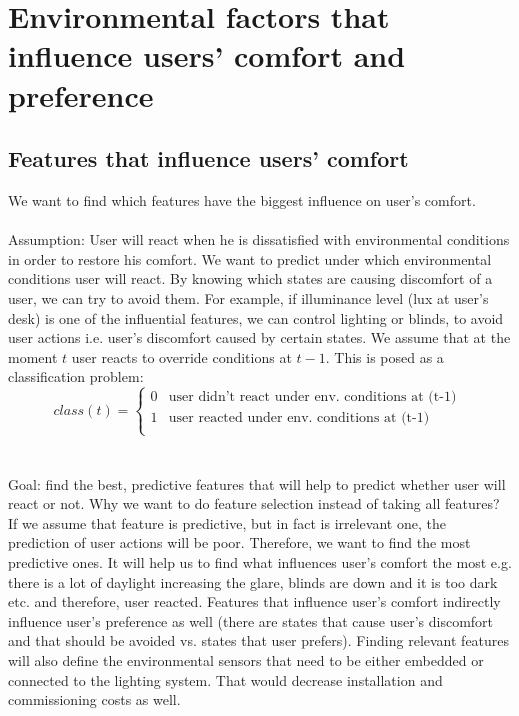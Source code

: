 \documentclass[a4paper]{article}
\begin{document}
\color{black}
\section{Environmental factors that  influence users' comfort and preference}
\subsection{Features that influence users' comfort} \label{sec:FeaturesUserComfort}

We want to find which features have the biggest influence on user's comfort.
\\\\
Assumption: User will react when he is dissatisfied with environmental conditions in order to restore his comfort. We want to predict under which environmental conditions user will react.  By knowing which states are causing discomfort of a user, we can try to avoid them. For example, if illuminance level (lux at user's desk) is one of the influential features, we can control lighting or blinds, to avoid user actions i.e. user's discomfort caused by certain states. We assume that at the moment $t$ user reacts to override conditions at $t-1$. This is posed as a classification problem:
\begin{equation}
class(t) = 
\begin{cases}
0 & \text{user didn't react under env. conditions at (t-1) }\\
1 & \text{user reacted under env. conditions at (t-1)}\\
\end{cases}
\end{equation}
\\\\
Goal: find the best, predictive features that will help to predict whether user will react or not. Why we want to do feature selection instead of taking all features? If we assume that feature is predictive, but in fact is irrelevant one, the prediction of user actions will be poor. Therefore, we want to find the most predictive ones. It will help us to find what influences user's comfort the most e.g. there is a lot of daylight increasing the glare, blinds are down and it is too dark etc. and therefore, user reacted. Features that influence user's comfort indirectly influence user's preference as well (there are states that cause user's discomfort and that should be avoided vs. states that user prefers).  Finding relevant features will also define the environmental sensors that need to be either embedded or connected to the lighting system. That would decrease installation and commissioning costs as well. 
\end{document}
